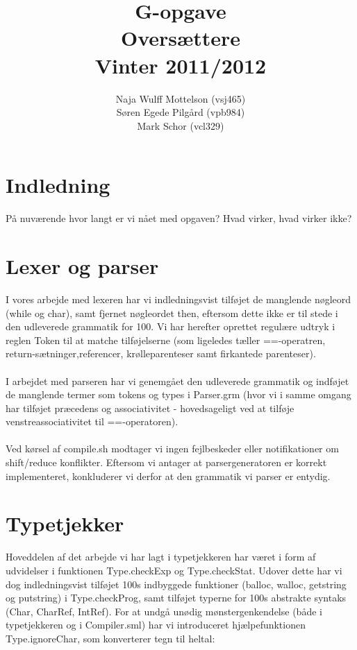 \documentclass[10pt,a4paper,danish]{article}
\title{G-opgave \\Oversættere\\Vinter 2011/2012}
\author{Naja Wulff Mottelson (vsj465) \\
        Søren Egede Pilgård (vpb984) \\
        Mark Schor (vcl329)}
\begin{document}
\maketitle
\newpage

\tableofcontents
\newpage

\section{Indledning}
På nuværende hvor langt er vi nået med opgaven? Hvad virker, hvad virker ikke?

\section{Lexer og parser}
I vores arbejde med lexeren har vi indledningsvist tilføjet de manglende
nøgleord (while og char), samt fjernet nøgleordet then, eftersom
dette ikke er til stede i den udleverede 
grammatik for 100. Vi har herefter oprettet
regulære udtryk i reglen Token  til at matche tilføjelserne (som ligeledes
tæller ==-operatren, return-sætninger,referencer, krølleparenteser samt
firkantede parenteser). 

\paragraph{}
I arbejdet med parseren har vi genemgået den udleverede grammatik 
og indføjet de manglende termer som tokens og types i Parser.grm
(hvor vi i samme omgang har tilføjet præcedens og associativitet - 
hovedsageligt ved at tilføje venstreassociativitet 
til ==-operatoren).

\paragraph{}
Ved kørsel af compile.sh modtager vi ingen fejlbeskeder eller 
notifikationer om shift/reduce konflikter. Eftersom vi antager at 
parsergeneratoren er korrekt implementeret, konkluderer vi derfor at den 
grammatik vi parser er entydig. 

\section{Typetjekker}
Hoveddelen af det arbejde vi har lagt i typetjekkeren har været i form
af udvidelser i funktionen Type.checkExp og Type.checkStat.
Udover dette har vi dog indledningsvist tilføjet 100s indbyggede
funktioner (balloc, walloc, getstring og putstring) i Type.checkProg, samt 
tilføjet typerne for 100s abstrakte syntaks (Char, CharRef, IntRef).
For at undgå unødig mønstergenkendelse (både i typetjekkeren og 
i Compiler.sml) har vi introduceret hjælpefunktionen Type.ignoreChar, 
som konverterer tegn til heltal: 
\end{document}
